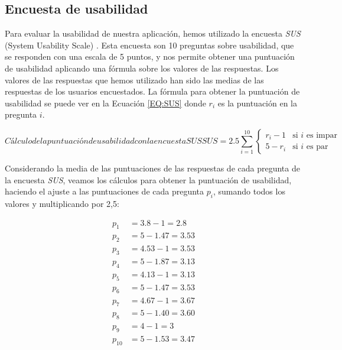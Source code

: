\subsection{Encuesta de usabilidad\label{SEC:ENCUESTA_USABILIDAD}}

Para evaluar la usabilidad de nuestra aplicación, hemos utilizado la encuesta \textit{SUS} (System Usability Scale) 
\cite{brooke1986system}. Esta encuesta son 10 preguntas sobre usabilidad, que se responden con una escala de 5 puntos, y 
nos permite obtener una puntuación de usabilidad aplicando una fórmula sobre los valores de las respuestas. Los valores 
de las respuestas que hemos utilizado han sido las medias de las respuestas de los usuarios encuestados. La fórmula para 
obtener la puntuación de usabilidad se puede ver en la Ecuación \ref{EQ:SUS} donde $r_i$ es la puntuación en la pregunta
$i$.

\begin{equation}[EQ:SUS]{Cálculo de la puntuación de usabilidad con la encuesta \textit{SUS}}
	\boxed{SUS = 2.5 \sum_{i=1}^{10}  \begin{cases}
        r_i - 1 & \text{si } i \text{ es impar} \\
        5 - r_i & \text{si } i \text{ es par}
        \end{cases}
        }
\end{equation}

Considerando la media de las puntuaciones de las respuestas de cada pregunta de la encuesta \textit{SUS}, veamos los cálculos
para obtener la puntuación de usabilidad, haciendo el ajuste a las puntuaciones de cada pregunta $p_i$, sumando todos los valores
y multiplicando por 2,5:

    \begin{align*}
        p_1 &= 3.8 - 1 = 2.8 \\
        p_2 &= 5 - 1.47 = 3.53 \\
        p_3 &= 4.53 - 1 = 3.53 \\
        p_4 &= 5 - 1.87 = 3.13 \\
        p_5 &= 4.13 - 1 = 3.13 \\
        p_6 &= 5 - 1.47 = 3.53 \\
        p_7 &= 4.67 - 1 = 3.67 \\
        p_8 &= 5 - 1.40 = 3.60 \\
        p_9 &= 4 - 1 = 3 \\
        p_{10} &= 5 - 1.53 = 3.47 \\
    \end{align*}


